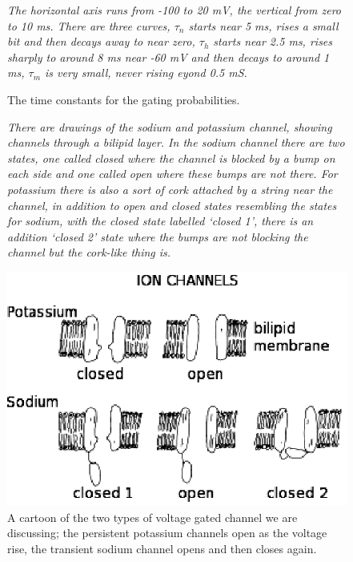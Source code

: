 \documentclass[12pt]{article}
\begin{document}
\begin{figure}
             {\textsl{The horizontal axis runs from -100 to 20 mV, the vertical from zero to 10 ms. There are three curves, $\tau_n$ starts near 5 ms, rises a small bit and then decays away to near zero, $\tau_h$ starts near 2.5 ms, rises sharply to around 8 ms near -60 mV and then decays to around 1 ms, $\tau_m$ is very small, never rising eyond 0.5 mS.}}
               {
\begin{center}

\end{center}
}
\caption{The time constants for the gating probabilities.\label{fig:tau_vals}}
\end{figure}


\begin{figure}
             {\textsl{There are drawings of the sodium and potassium channel, showing channels through a bilipid layer. In the sodium channel there are two states, one called closed where the channel is blocked by a bump on each side and one called open where these bumps are not there. For potassium there is also a sort of cork attached by a string near the channel, in addition to open and closed states resembling the states for sodium, with the closed state labelled `closed 1', there is an addition `closed 2' state where the bumps are not blocking the channel but the cork-like thing is.}}
               {
  \begin{center}
\includegraphics{ChannelsBlack.eps}
  \end{center}
  }
\caption{A cartoon of the two types of voltage gated channel we are
  discussing; the persistent potassium channels open as the voltage
  rise, the transient sodium channel opens and then closes
  again.\label{ChannelsBlack}}
\end{figure}
\end{document}
